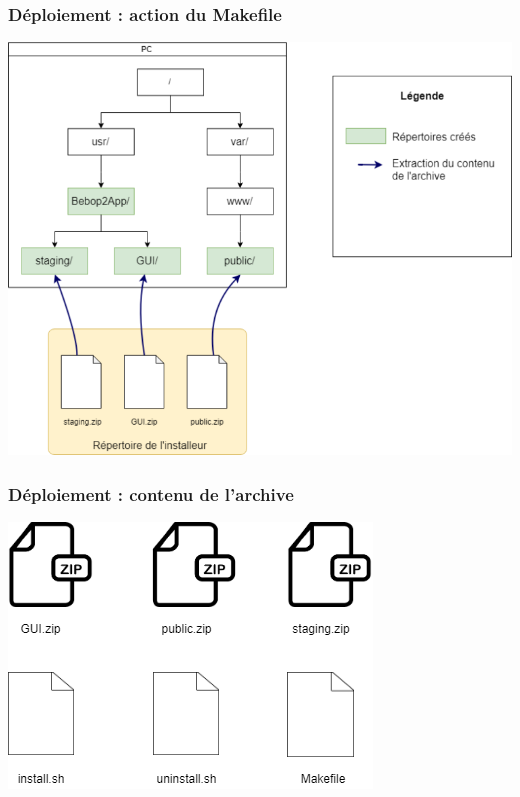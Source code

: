 \documentclass{beamer}
\begin{document}
	
	\begin{frame}
		\begin{center}
		\frametitle{Déploiement : action du Makefile}
        \includegraphics[scale=0.3]{deploiement.png}
		\end{center}
	\end{frame}
	
	
	\begin{frame}
		\begin{center}
		\frametitle{Déploiement : contenu de l'archive}
        \includegraphics[scale=0.55]{contenu_archive.png}
		\end{center}
	\end{frame}
	
\end{document}
